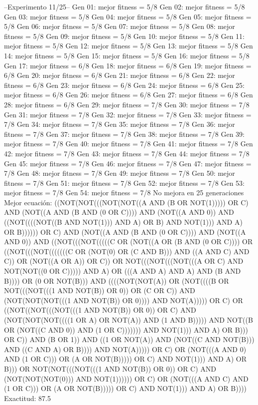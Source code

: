 --Experimento 
 11/25--
Gen 01: mejor fitness = 5/8
Gen 02: mejor fitness = 5/8
Gen 03: mejor fitness = 5/8
Gen 04: mejor fitness = 5/8
Gen 05: mejor fitness = 5/8
Gen 06: mejor fitness = 5/8
Gen 07: mejor fitness = 5/8
Gen 08: mejor fitness = 5/8
Gen 09: mejor fitness = 5/8
Gen 10: mejor fitness = 5/8
Gen 11: mejor fitness = 5/8
Gen 12: mejor fitness = 5/8
Gen 13: mejor fitness = 5/8
Gen 14: mejor fitness = 5/8
Gen 15: mejor fitness = 5/8
Gen 16: mejor fitness = 5/8
Gen 17: mejor fitness = 6/8
Gen 18: mejor fitness = 6/8
Gen 19: mejor fitness = 6/8
Gen 20: mejor fitness = 6/8
Gen 21: mejor fitness = 6/8
Gen 22: mejor fitness = 6/8
Gen 23: mejor fitness = 6/8
Gen 24: mejor fitness = 6/8
Gen 25: mejor fitness = 6/8
Gen 26: mejor fitness = 6/8
Gen 27: mejor fitness = 6/8
Gen 28: mejor fitness = 6/8
Gen 29: mejor fitness = 7/8
Gen 30: mejor fitness = 7/8
Gen 31: mejor fitness = 7/8
Gen 32: mejor fitness = 7/8
Gen 33: mejor fitness = 7/8
Gen 34: mejor fitness = 7/8
Gen 35: mejor fitness = 7/8
Gen 36: mejor fitness = 7/8
Gen 37: mejor fitness = 7/8
Gen 38: mejor fitness = 7/8
Gen 39: mejor fitness = 7/8
Gen 40: mejor fitness = 7/8
Gen 41: mejor fitness = 7/8
Gen 42: mejor fitness = 7/8
Gen 43: mejor fitness = 7/8
Gen 44: mejor fitness = 7/8
Gen 45: mejor fitness = 7/8
Gen 46: mejor fitness = 7/8
Gen 47: mejor fitness = 7/8
Gen 48: mejor fitness = 7/8
Gen 49: mejor fitness = 7/8
Gen 50: mejor fitness = 7/8
Gen 51: mejor fitness = 7/8
Gen 52: mejor fitness = 7/8
Gen 53: mejor fitness = 7/8
Gen 54: mejor fitness = 7/8
No mejora en 25 generaciones
Mejor ecuación: ((NOT(NOT(((NOT(NOT((A AND (B OR NOT(1))))) OR C) AND (NOT((A AND (B AND (0 OR C)))) AND (NOT((A AND 0)) AND ((NOT((((NOT((B AND NOT(1))) AND A) OR B) AND NOT(1))) AND A) OR B)))))) OR C) AND (NOT((A AND (B AND (0 OR C)))) AND (NOT((A AND 0)) AND ((NOT(((NOT(((((C OR (NOT((A OR (B AND (0 OR C)))) OR ((NOT(((NOT(((((((C OR (NOT(0) OR (C AND B))) AND ((A AND C) AND C)) OR (NOT((A OR A)) OR C)) OR NOT(((NOT(((NOT(((A OR C) AND NOT(NOT((0 OR C))))) AND A) OR (((A AND A) AND A) AND (B AND B)))) OR (0 OR NOT(B))) AND ((((NOT(NOT(A)) OR (NOT((((B OR NOT(((NOT(((1 AND NOT(B)) OR 0)) OR (C OR C)) AND (NOT(NOT(NOT(((1 AND NOT(B)) OR 0)))) AND NOT(A))))) OR C) OR ((NOT((NOT(((NOT(((1 AND NOT(B)) OR 0)) OR C) AND (NOT(NOT(NOT((((1 OR A) OR NOT(A)) AND (1 AND B))))) AND NOT((B OR (NOT((C AND 0)) AND (1 OR C))))))) AND NOT(1))) AND A) OR B))) OR C)) AND (B OR 1)) AND ((1 OR NOT(A)) AND (NOT((C AND NOT(B))) AND ((C AND A) OR B)))) AND NOT(A))))) OR C) OR (NOT(((A AND 0) AND (1 OR C))) OR (A OR NOT(B))))) OR C) AND NOT(1))) AND A) OR B))) OR NOT(NOT(((NOT(((1 AND NOT(B)) OR 0)) OR C) AND (NOT(NOT(NOT(0))) AND NOT(1)))))) OR C) OR (NOT(((A AND C) AND (1 OR C))) OR (A OR NOT(B))))) OR C) AND NOT(1))) AND A) OR B))))
 Exactitud: 87.5%

